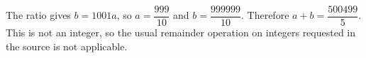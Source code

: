 The ratio gives $b=1001a$, so $a=\dfrac{999}{10}$ and $b=\dfrac{999999}{10}$. Therefore $\boxed{a+b=\dfrac{500499}{5}}$. This is not an integer, so the usual remainder operation on integers requested in the source is not applicable.
